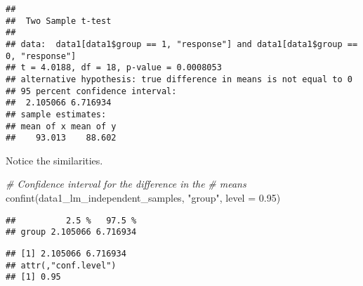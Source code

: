 \documentclass[
]{book}
\newenvironment{Shaded}{\begin{snugshade}}{\end{snugshade}}
\newcommand{\AttributeTok}[1]{\textcolor[rgb]{0.77,0.63,0.00}{#1}}
\newcommand{\CommentTok}[1]{\textcolor[rgb]{0.56,0.35,0.01}{\textit{#1}}}
\newcommand{\ConstantTok}[1]{\textcolor[rgb]{0.00,0.00,0.00}{#1}}
\newcommand{\DecValTok}[1]{\textcolor[rgb]{0.00,0.00,0.81}{#1}}
\newcommand{\FloatTok}[1]{\textcolor[rgb]{0.00,0.00,0.81}{#1}}
\newcommand{\FunctionTok}[1]{\textcolor[rgb]{0.00,0.00,0.00}{#1}}
\newcommand{\NormalTok}[1]{#1}
\newcommand{\SpecialCharTok}[1]{\textcolor[rgb]{0.00,0.00,0.00}{#1}}
\newcommand{\StringTok}[1]{\textcolor[rgb]{0.31,0.60,0.02}{#1}}
\begin{document}
\begin{Shaded}
\end{Shaded}

\begin{verbatim}
## 
##  Two Sample t-test
## 
## data:  data1[data1$group == 1, "response"] and data1[data1$group == 0, "response"]
## t = 4.0188, df = 18, p-value = 0.0008053
## alternative hypothesis: true difference in means is not equal to 0
## 95 percent confidence interval:
##  2.105066 6.716934
## sample estimates:
## mean of x mean of y 
##    93.013    88.602
\end{verbatim}

Notice the similarities.

\begin{Shaded}
\begin{Highlighting}[]
\CommentTok{\# Confidence interval for the difference in the}
\CommentTok{\# means}
\FunctionTok{confint}\NormalTok{(data1\_lm\_independent\_samples, }\StringTok{"group"}\NormalTok{, }\AttributeTok{level =} \FloatTok{0.95}\NormalTok{)}
\end{Highlighting}
\end{Shaded}

\begin{verbatim}
##          2.5 %   97.5 %
## group 2.105066 6.716934
\end{verbatim}

\begin{Shaded}
\end{Shaded}

\begin{verbatim}
## [1] 2.105066 6.716934
## attr(,"conf.level")
## [1] 0.95
\end{verbatim}
\end{document}
